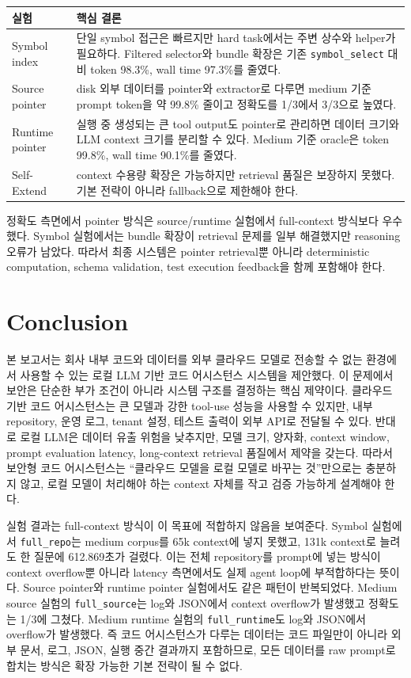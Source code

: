 \documentclass[11pt,a4paper]{article}
\begin{document}
\begin{table}[htbp]
\centering
\begin{tabularx}{\textwidth}{lY}
\toprule
실험 & 핵심 결론 \\
\midrule
Symbol index & 단일 symbol 접근은 빠르지만 hard task에서는 주변 상수와 helper가 필요하다. Filtered selector와 bundle 확장은 기존 \texttt{symbol\_select} 대비 token 98.3\%, wall time 97.3\%를 줄였다. \\
Source pointer & disk 외부 데이터를 pointer와 extractor로 다루면 medium 기준 prompt token을 약 99.8\% 줄이고 정확도를 1/3에서 3/3으로 높였다. \\
Runtime pointer & 실행 중 생성되는 큰 tool output도 pointer로 관리하면 데이터 크기와 LLM context 크기를 분리할 수 있다. Medium 기준 oracle은 token 99.8\%, wall time 90.1\%를 줄였다. \\
Self-Extend & context 수용량 확장은 가능하지만 retrieval 품질은 보장하지 못했다. 기본 전략이 아니라 fallback으로 제한해야 한다. \\
\bottomrule
\end{tabularx}
\end{table}

정확도 측면에서 pointer 방식은 source/runtime 실험에서 full-context 방식보다 우수했다. Symbol 실험에서는 bundle 확장이 retrieval 문제를 일부 해결했지만 reasoning 오류가 남았다. 따라서 최종 시스템은 pointer retrieval뿐 아니라 deterministic computation, schema validation, test execution feedback을 함께 포함해야 한다.

\section{Conclusion}

본 보고서는 회사 내부 코드와 데이터를 외부 클라우드 모델로 전송할 수 없는 환경에서 사용할 수 있는 로컬 LLM 기반 코드 어시스턴스 시스템을 제안했다. 이 문제에서 보안은 단순한 부가 조건이 아니라 시스템 구조를 결정하는 핵심 제약이다. 클라우드 기반 코드 어시스턴스는 큰 모델과 강한 tool-use 성능을 사용할 수 있지만, 내부 repository, 운영 로그, tenant 설정, 테스트 출력이 외부 API로 전달될 수 있다. 반대로 로컬 LLM은 데이터 유출 위험을 낮추지만, 모델 크기, 양자화, context window, prompt evaluation latency, long-context retrieval 품질에서 제약을 갖는다. 따라서 보안형 코드 어시스턴스는 ``클라우드 모델을 로컬 모델로 바꾸는 것''만으로는 충분하지 않고, 로컬 모델이 처리해야 하는 context 자체를 작고 검증 가능하게 설계해야 한다.

실험 결과는 full-context 방식이 이 목표에 적합하지 않음을 보여준다. Symbol 실험에서 \texttt{full\_repo}는 medium corpus를 65k context에 넣지 못했고, 131k context로 늘려도 한 질문에 612.869초가 걸렸다. 이는 전체 repository를 prompt에 넣는 방식이 context overflow뿐 아니라 latency 측면에서도 실제 agent loop에 부적합하다는 뜻이다. Source pointer와 runtime pointer 실험에서도 같은 패턴이 반복되었다. Medium source 실험의 \texttt{full\_source}는 log와 JSON에서 context overflow가 발생했고 정확도는 1/3에 그쳤다. Medium runtime 실험의 \texttt{full\_runtime}도 log와 JSON에서 overflow가 발생했다. 즉 코드 어시스턴스가 다루는 데이터는 코드 파일만이 아니라 외부 문서, 로그, JSON, 실행 중간 결과까지 포함하므로, 모든 데이터를 raw prompt로 합치는 방식은 확장 가능한 기본 전략이 될 수 없다.
\end{document}
